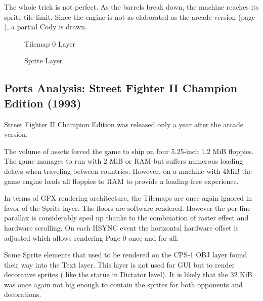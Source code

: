 \vspace{4ex}

The whole trick is not perfect. As the barrels break down, the machine reaches its sprite tile limit. Since the engine is not as elaborated as the arcade version (page \pageref{going_too_far}), a partial Cody is drawn. 

\vspace{-4ex}
\begin{minipage}[t]{0.49\linewidth}
  \begin{figure}[H]
  \caption*{Tilemap 0 Layer}
  \end{figure}
\end{minipage}%
\hfill
\begin{minipage}[t]{0.49\linewidth}
   \begin{figure}[H]
  \caption*{Sprite Layer}
  \end{figure}
\end{minipage}

\pagebreak

\subsection{Ports Analysis: Street Fighter II Champion Edition (1993)}
Street Fighter II Champion Edition was released only a year after the arcade version.

The volume of assets forced the game to ship on four 5.25-inch 1.2 MiB floppies. The game manages to run with 2 MiB or RAM but suffers numerous loading delays when traveling between countries. However, on a machine with 4MiB the game engine loads all floppies to RAM to provide a loading-free experience.

In terms of GFX rendering architecture, the Tilemaps are once again ignored in favor of the Sprite layer. The floors are software rendered. However the per-line parallax is considerably sped up thanks to the combination of raster effect and hardware scrolling. On each HSYNC event the horizontal hardware offset is adjusted which allows rendering Page 0 once and for all.

Some Sprite elements that used to be rendered on the CPS-1 OBJ layer found their way into the Text layer. This layer is not used for GUI but to render decorative sprites (  like the statue in Dictator level). It is likely that the 32 KiB was once again not big enough to contain the sprites for both opponents and decorations.

